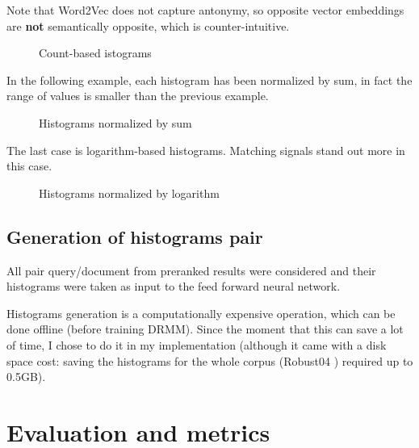 Note that Word2Vec does not capture antonymy, so opposite vector embeddings are \textbf{not} semantically opposite, which is counter-intuitive.

\begin{figure}[H]
  \centering
  \hfill
  \caption{Count-based istograms}
  \label{fig:hist_ex}
\end{figure}

In the following example, each histogram has been normalized by sum, in fact
the range of values is smaller than the previous example.

\begin{figure}[H]
  \centering
  \hfill
  \caption{Histograms normalized by sum}
  \label{fig:hist_nh_ex}
\end{figure}

The last case is logarithm-based histograms. Matching signals stand out more in this case.

\begin{figure}[H]
  \centering
  \hfill
  \caption{Histograms normalized by logarithm}
  \label{fig:hist_lch_sample}
\end{figure}

\subsection{Generation of histograms pair}

All pair query/document from preranked results were considered and their histograms were taken as input to the feed forward neural network.

Histograms generation is a computationally expensive operation, which can be done offline (before training DRMM). Since the moment that this can save a lot of time, I chose to do it in my implementation (although it came with a disk space cost: saving the histograms for the whole corpus (Robust04 \cite{rob04}) required up to 0.5GB).

\section{Evaluation and metrics}
\label{sec:comparison}

